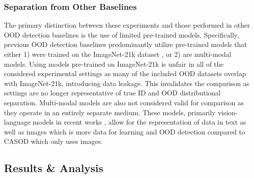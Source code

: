 \subsubsection{Separation from Other Baselines}
The primary distinction between these experiments and those performed in other OOD detection baselines is the use of limited pre-trained models. Specifically, previous OOD detection baselines predominantly utilize pre-trained models that either 1) were trained on the ImageNet-21k dataset \cite{krizhevsky2012imagenet}, or 2) are multi-modal models. Using models pre-trained on ImageNet-21k is unfair in all of the considered experimental settings as many of the included OOD datasets overlap with ImageNet-21k, introducing data leakage. This invalidates the comparison as settings are no longer representative of true ID and OOD distributional separation. Multi-modal models are also not considered valid for comparison as they operate in an entirely separate medium. These models, primarily vision-language models in recent works \cite{miyai2024locoop}, allow for the representation of data in text as well as images which is more data for learning and OOD detection compared to CASOD which only uses images.

\subsection{Results \& Analysis}
\label{sec:casod_results}

